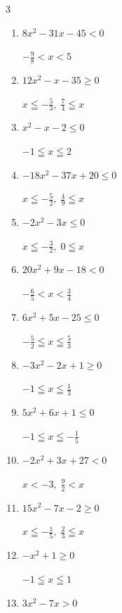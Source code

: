 \begin{multicols}{3}
\begin{enumerate}
\resetques

  \item $8x^{2}-31x-45<0$

        $\displaystyle -\frac{9}{8} < x < 5$

  \item $12x^{2}-x-35\geq 0$

        $\displaystyle x \leqq -\frac{5}{3} , \; \frac{7}{4} \leqq x$

  \item $x^{2}-x-2\leq 0$

        $\displaystyle -1 \leqq x \leqq 2$

  \item $-18x^{2}-37x+20\leq 0$

        $\displaystyle x \leqq -\frac{5}{2} , \; \frac{4}{9} \leqq x$

  \item $-2x^{2}-3x\leq 0$

        $\displaystyle x \leqq -\frac{3}{2} , \; 0 \leqq x$

  \item $20x^{2}+9x-18<0$

        $\displaystyle -\frac{6}{5} < x < \frac{3}{4}$

  \item $6x^{2}+5x-25\leq 0$

        $\displaystyle -\frac{5}{2} \leqq x \leqq \frac{5}{3}$

  \item $-3x^{2}-2x+1\geq 0$

        $\displaystyle -1 \leqq x \leqq \frac{1}{3}$

  \item $5x^{2}+6x+1\leq 0$

        $\displaystyle -1 \leqq x \leqq -\frac{1}{5}$

  \item $-2x^{2}+3x+27<0$

        $\displaystyle x < -3 , \; \frac{9}{2} < x$

\columnbreak %

  \item $15x^{2}-7x-2\geq 0$

        $\displaystyle x \leqq -\frac{1}{5} , \; \frac{2}{3} \leqq x$

  \item $-x^{2}+1\geq 0$

        $\displaystyle -1 \leqq x \leqq 1$

  \item $3x^{2}-7x>0$


\end{enumerate}
\end{multicols}
